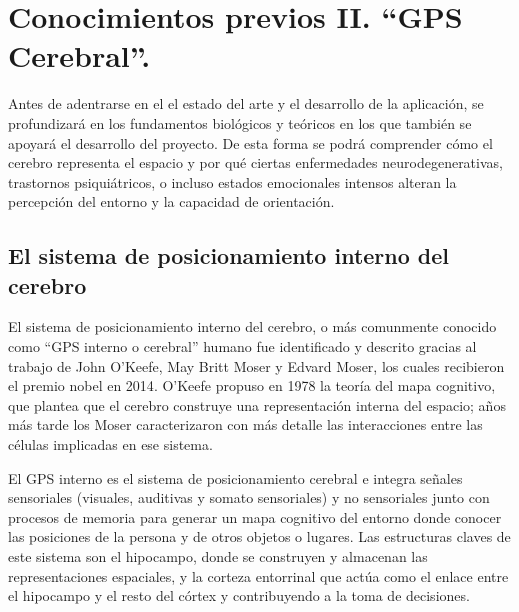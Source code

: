     \section{Conocimientos previos II. ``GPS Cerebral''.}\label{previos}

    Antes de adentrarse en el el estado del arte y el desarrollo de la aplicación, se profundizará en los fundamentos biológicos y teóricos en los que también se apoyará el desarrollo del proyecto. De esta forma se podrá comprender cómo el cerebro representa el espacio y por qué ciertas enfermedades neurodegenerativas, trastornos psiquiátricos, o incluso estados emocionales intensos alteran la percepción del entorno y la capacidad de orientación. \cite{ManualDeBusquedayRescate}
    
    

    
    \subsection{El sistema de posicionamiento interno del cerebro}

   El sistema de posicionamiento interno del cerebro, o más comunmente conocido como ``GPS interno o cerebral'' humano fue identificado y descrito gracias al trabajo de John O'Keefe, May Britt Moser y Edvard Moser, los cuales recibieron el premio nobel en 2014\cite{PrensaNobel_GPSCerebral}. O'Keefe propuso en 1978 la teoría del mapa cognitivo\cite{MapaCognitivo_O_KEEFE,GPS_Cerebral_O_KEEFE}, que plantea que el cerebro construye una representación interna del espacio; años más tarde los Moser caracterizaron con más detalle las interacciones entre las células implicadas en ese sistema\cite{GPSCerebral_MOSER,TiposCelulas_GPSCerebral}.
   
    El GPS interno es el sistema de posicionamiento cerebral e integra señales sensoriales (visuales, auditivas y somato sensoriales) y no sensoriales junto con procesos de memoria para generar un mapa cognitivo del entorno donde conocer las posiciones de la persona y de otros objetos o lugares. Las estructuras claves de este sistema son el hipocampo, donde se construyen y almacenan las representaciones espaciales, y la corteza entorrinal que actúa como el enlace entre el hipocampo y el resto del córtex y contribuyendo a la toma de decisiones.

    
